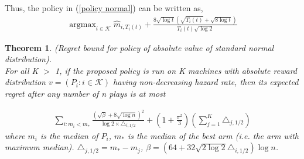 \documentclass{article}
\DeclareMathOperator*{\argmax}{argmax}
\theoremstyle{plain}
\newtheorem{theo}{Theorem}
\begin{document}
Thus, the policy in (\ref{policy normal}) can be written as,
\begin{align}
    \argmax_{i \in \mathcal{K}} \hat{m}_{i, T_i(t)} + \frac{8 \sqrt{\log t} (\sqrt{ T_i(t)} + \sqrt{8\log t})}{T_i(t)  \sqrt{\log 2}}
\end{align}

\begin{theo}
(Regret bound for policy of absolute value of standard normal distribution). \\

For all K $>$ 1, if the proposed policy is run on K machines with absolute reward distribution $v = (P_i: i \in \mathcal{K})$ having non-decreasing hazard rate, then its expected regret after any number of n plays is at most

\begin{align}
    \sum_{i: m_i < m_\ast} \frac{(\sqrt{\beta} + 8 \sqrt{\log n})^2}{\log 2 \times \triangle_{i, 1/2}} + (1 + \frac{\pi^2}{3}) (\sum_{j=1}^K \triangle_{j, 1/2})
\end{align}
where $m_i$ is the median of $P_i$, $m_\ast$ is the median of the best arm (i.e. the arm with maximum median). $\triangle_{j, 1/2} = m_\ast - m_j$, $\beta = (64 + 32 \sqrt{2 \log 2} \triangle_{i,1/2} )\log n$.
\end{theo}
\end{document}
